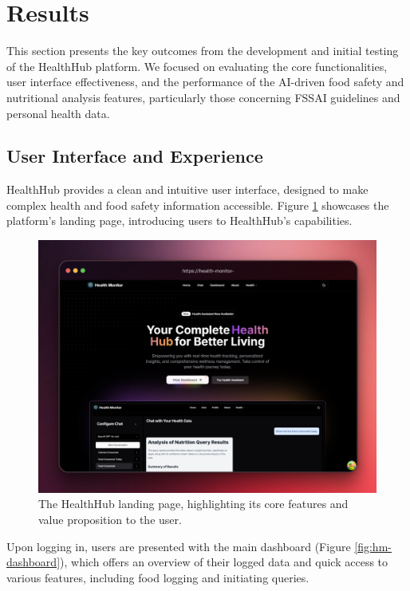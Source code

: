 \section{Results}

This section presents the key outcomes from the development and initial testing of the HealthHub platform. We focused on evaluating the core functionalities, user interface effectiveness, and the performance of the AI-driven food safety and nutritional analysis features, particularly those concerning FSSAI guidelines and personal health data.

\subsection{User Interface and Experience}
HealthHub provides a clean and intuitive user interface, designed to make complex health and food safety information accessible. Figure \ref{fig:hm-hero} showcases the platform's landing page, introducing users to HealthHub's capabilities.

\begin{figure}[!t]
\centering
\includegraphics[width=0.9\columnwidth]{figures/hm-hero.png} %
\caption{The HealthHub landing page, highlighting its core features and value proposition to the user.}
\label{fig:hm-hero}
\end{figure}

Upon logging in, users are presented with the main dashboard (Figure \ref{fig:hm-dashboard}), which offers an overview of their logged data and quick access to various features, including food logging and initiating queries.

